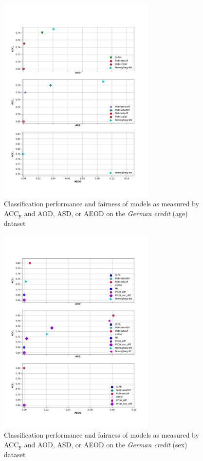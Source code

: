 \documentclass[preprint,12pt]{elsarticle}
\begin{document}
\begin{figure}
	\center
	\includegraphics[angle=0, width=0.7\textwidth]{Ger_age_ACC.png}
	\captionsetup{justification=centering}
	\caption{Classification performance and fairness of models as measured by ACC$_\mathbf{y}$ and AOD, ASD, or AEOD on the \textit{German credit} (age) dataset}
	\label{fig:Ger-sex-res}
	\vskip -0.2in
\end{figure}

\begin{figure}
	\center
	\includegraphics[angle=0, width=0.7\textwidth]{Ger_sex_ACC.png}
	\captionsetup{justification=centering}
	\caption{Classification performance and fairness of models as measured by ACC$_\mathbf{y}$ and AOD, ASD, or AEOD on the \textit{German credit} (sex) dataset}
	\label{fig:Ger-age-res}
	\vskip -0.2in
\end{figure}
\end{document}
